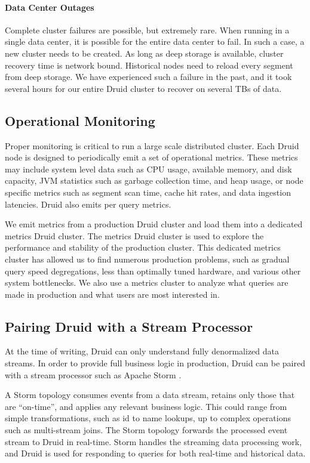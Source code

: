 \documentclass{acm_proc_article-sp}
\begin{document}
\paragraph{Data Center Outages}
Complete cluster failures are possible, but extremely rare. When running
in a single data center, it is possible for the entire data center to fail. In
such a case, a new cluster needs to be created. As long as deep storage is
available, cluster recovery time is network bound. Historical nodes need to
reload every segment from deep storage. We have experienced such a failure in
the past, and it took several hours for our entire Druid cluster to recover on
several TBs of data.

\subsection{Operational Monitoring}
Proper monitoring is critical to run a large scale distributed cluster.
Each Druid node is designed to periodically emit a set of operational metrics.
These metrics may include system level data such as CPU usage, available
memory, and disk capacity, JVM statistics such as garbage collection time, and
heap usage, or node specific metrics such as segment scan time, cache
hit rates, and data ingestion latencies. Druid also emits per query metrics.

We emit metrics from a production Druid cluster and load them into a dedicated
metrics Druid cluster. The metrics Druid cluster is used to explore the
performance and stability of the production cluster. This dedicated metrics
cluster has allowed us to find numerous production problems, such as gradual
query speed degregations, less than optimally tuned hardware, and various other
system bottlenecks. We also use a metrics cluster to analyze what queries are
made in production and what users are most interested in. 

\subsection{Pairing Druid with a Stream Processor}
At the time of writing, Druid can only understand fully denormalized data
streams. In order to provide full business logic in production, Druid can be
paired with a stream processor such as Apache Storm \cite{marz2013storm}.

A Storm topology consumes events from a data stream, retains only those that are
“on-time”, and applies any relevant business logic. This could range from
simple transformations, such as id to name lookups, up to complex operations
such as multi-stream joins. The Storm topology forwards the processed event
stream to Druid in real-time. Storm handles the streaming data processing work,
and Druid is used for responding to queries for both real-time and
historical data. 
\end{document}
